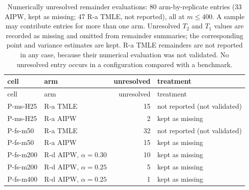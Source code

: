 {\scriptsize\setlength{\tabcolsep}{3pt}
\begin{longtable}{@{}llrl@{}}
\caption{Numerically unresolved remainder evaluations: 80 arm-by-replicate entries (33 AIPW, kept as missing; 47 R-a TMLE, not reported), all at $m\le400$. A sample may contribute entries for more than one arm. Unresolved $T_2$ and $T_1$ values are recorded as missing and omitted from remainder summaries; the corresponding point and variance estimates are kept. R-a TMLE remainders are not reported in any case, because their numerical evaluation was not validated. No unresolved entry occurs in a configuration compared with a benchmark.}\label{tab:S-unresolved}\\
\toprule
cell & arm & unresolved & treatment\\
\midrule
\endfirsthead
\toprule
cell & arm & unresolved & treatment\\
\midrule
\endhead
\bottomrule
\endlastfoot
P-ms-H25 & R-a TMLE & 15 & not reported (not validated)\\
P-ms-H25 & R-a AIPW & 2 & kept as missing\\
P-fs-m50 & R-a TMLE & 32 & not reported (not validated)\\
P-fs-m50 & R-a AIPW & 15 & kept as missing\\
P-fs-m200 & R-d AIPW, $\alpha=0.30$ & 10 & kept as missing\\
P-fs-m200 & R-d AIPW, $\alpha=0.25$ & 5 & kept as missing\\
P-fs-m400 & R-d AIPW, $\alpha=0.25$ & 1 & kept as missing\\
\end{longtable}}
